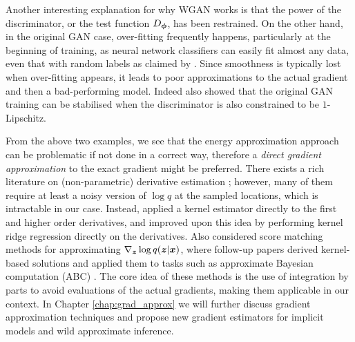 \begin{itemize}
Another interesting explanation for why WGAN works is that the power of the discriminator, or the test function $D_{\bm{\phi}}$, has been restrained. On the other hand, in the original GAN case, over-fitting frequently happens, particularly at the beginning of training, as neural network classifiers can easily fit almost any data, even that with random labels as claimed by \cite{zhang:understanding2017}. Since smoothness is typically lost when over-fitting appears, it leads to poor approximations to the actual gradient and then a bad-performing model. Indeed \cite{kodali:dragan2017} also showed that the original GAN training can be stabilised when the discriminator is also constrained to be $1$-Lipschitz. 

\end{itemize}

From the above two examples, we see that the energy approximation approach can be problematic if not done in a correct way, therefore a \emph{direct gradient approximation} to the exact gradient might be preferred. There exists a rich literature on (non-parametric) derivative estimation \citep{stone:spline1985, zhou:spline2000, ruppert:lpr1994, fan:local_poly1996, debrabanter:lpr2013}; however, many of them require at least a noisy version of $\log q$ at the sampled locations, which is intractable in our case. Instead, \cite{singh:kernel_gradient1977} applied a kernel estimator directly to the first and higher order derivatives, and \cite{sasaki:gradient2015} improved upon this idea by performing kernel ridge regression directly on the derivatives. 
%
Also \cite{hyvarinen:score2005} considered score matching methods for approximating $\nabla_{\bm{z}} \log q(\bm{z} | \bm{x})$, where follow-up papers \citep{sasaki:gradient2014, strathmann:kmc2015} derived kernel-based solutions and applied them to tasks such as approximate Bayesian computation (ABC) \citep{beaumont:abc2002}.
%
The core idea of these methods is the use of integration by parts to avoid evaluations of the actual gradients, making them applicable in our context. In Chapter \ref{chap:grad_approx} we will further discuss gradient approximation techniques and propose new gradient estimators for implicit models and wild approximate inference.

